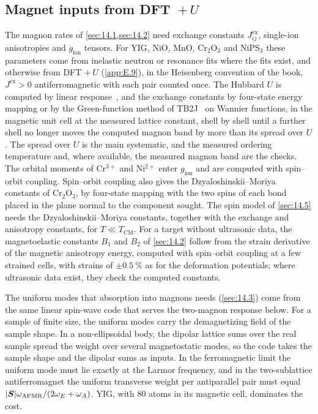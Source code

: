 \subsection{Magnet inputs from DFT~\texorpdfstring{$+\,U$}{+U}}\label{app:E.20-magnet}

The magnon rates of \cref{sec:14.1,sec:14.2} need exchange constants $J^{\mathrm{ex}}_{ij}$, single-ion anisotropies and $g_{\mathrm{ion}}$ tensors. For YIG, NiO, MnO, Cr$_2$O$_3$ and NiPS$_3$ these parameters come from inelastic neutron or resonance fits where the fits exist, and otherwise from DFT $+\,U$ (\cref{app:E.9}), in the Heisenberg convention of the book, $J^{\mathrm{ex}} > 0$ antiferromagnetic with each pair counted once. The Hubbard $U$ is computed by linear response~\cite{timrov2018hubbard}, and the exchange constants by four-state energy mapping or by the Green-function method of TB2J~\cite{he2021tb2j} on Wannier functions, in the magnetic unit cell at the measured lattice constant, shell by shell until a further shell no longer moves the computed magnon band by more than its spread over $U$. The spread over $U$ is the main systematic, and the measured ordering temperature and, where available, the measured magnon band are the checks. The orbital moments of Cr$^{3+}$ and Ni$^{2+}$ enter $g_{\mathrm{ion}}$ and are computed with spin--orbit coupling. Spin--orbit coupling also gives the Dzyaloshinskii--Moriya constants of Cr$_2$O$_3$, by four-state mapping with the two spins of each bond placed in the plane normal to the component sought. The spin model of \cref{sec:14.5} needs the Dzyaloshinskii--Moriya constants, together with the exchange and anisotropy constants, for $T \ll T_{\mathrm{CM}}$. For a target without ultrasonic data, the magnetoelastic constants $B_1$ and $B_2$ of \cref{sec:14.2} follow from the strain derivative of the magnetic anisotropy energy, computed with spin--orbit coupling at a few strained cells, with strains of $\pm\SI{0.5}{\percent}$ as for the deformation potentials; where ultrasonic data exist, they check the computed constants.

The uniform modes that absorption into magnons needs (\cref{sec:14.3}) come from the same linear spin-wave code that serves the two-magnon response below. For a sample of finite size, the uniform modes carry the demagnetizing field of the sample shape. In a non-ellipsoidal body, the dipolar lattice sums over the real sample spread the weight over several magnetostatic modes, so the code takes the sample shape and the dipolar sums as inputs. In the ferromagnetic limit the uniform mode must lie exactly at the Larmor frequency, and in the two-sublattice antiferromagnet the uniform transverse weight per antiparallel pair must equal $|\bm{S}|\omega_{\mathrm{AFMR}}/(2\omega_E + \omega_A)$. YIG, with 80 atoms in its magnetic cell, dominates the cost.

